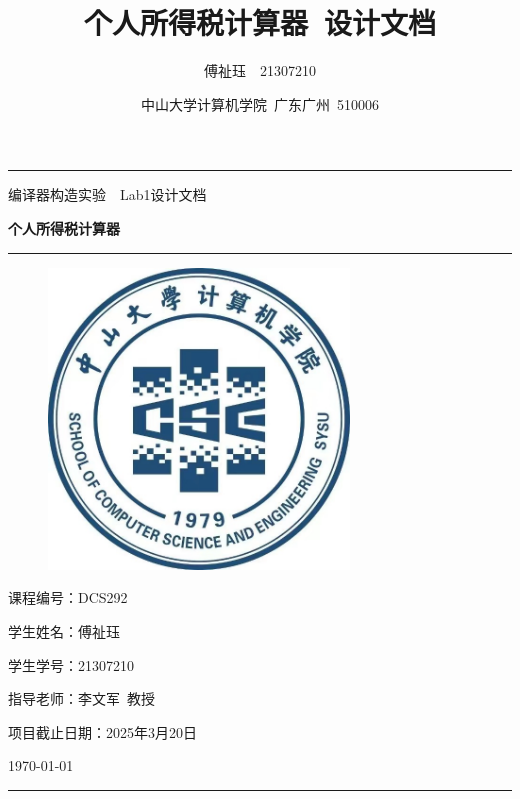 \documentclass[a4paper, utf8]{ctexart}
\title{\songti \bfseries 个人所得税计算器\ 设计文档}
\author{\fangsong 傅祉珏\ \ 21307210}
\date{\fangsong 中山大学计算机学院\ 广东广州\ 510006}
\begin{document}
    \begin{titlepage}
        \centering
        \rule{\textwidth}{1pt}
        \vspace{0.02\textheight}

        {\LARGE \kaishu 编译器构造实验\ \ Lab1设计文档}

        \vspace{0.02\textheight}

        {\Huge \songti \bfseries 个人所得税计算器}

        \vspace{0.025\textheight}
        \rule{0.83\textwidth}{0.4pt}
        \vspace{0.05\textheight} 
        
        \begin{figure}[htbp]
            \centering
            \includegraphics[width=8cm, height=8cm]{./figure/计院院徽.jpg}
        \end{figure}

        \vspace{0.05\textheight} 
        {\Large 课程编号：\textsc{DCS292}}

        \vspace{0.025\textheight} 
        {\Large 学生姓名：\textsc{傅祉珏}}

        \vspace{0.025\textheight} 
        {\Large 学生学号：\textsc{21307210}}

        \vspace{0.025\textheight} 
        {\Large 指导老师：\textsc{李文军\ 教授}}
 
        \vspace{0.025\textheight} 
        {\Large 项目截止日期：\textsc{2025年3月20日}}

        \vspace{0.05\textheight} 
        \vfill

        {\large \today}
        \vspace{0.1\textheight}
        \rule{\textwidth}{1pt}
    \end{titlepage}
    
\end{document}
